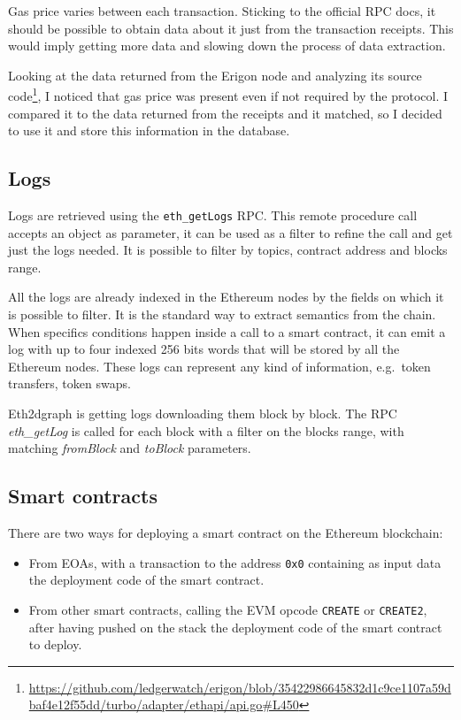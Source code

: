 Gas price varies between each transaction. Sticking to the official RPC docs, it should be possible to obtain data about it just from the transaction receipts. This would imply getting more data and slowing down the process of data extraction.

Looking at the data returned from the Erigon node and analyzing its source code\footnote{\url{https://github.com/ledgerwatch/erigon/blob/35422986645832d1c9ce1107a59dbaf4e12f55dd/turbo/adapter/ethapi/api.go\#L450}}, I noticed that gas price was present even if not required by the protocol. I compared it to the data returned from the receipts and it matched, so I decided to use it and store this information in the database.

\subsection{Logs}

Logs are retrieved using the \texttt{eth\_getLogs} RPC. This remote procedure call accepts an object as parameter, it can be used as a filter to refine the call and get just the logs needed. It is possible to filter by topics, contract address and blocks range. 

All the logs are already indexed in the Ethereum nodes by the fields on which it is possible to filter. It is the standard way to extract semantics from the chain. When specifics conditions happen inside a call to a smart contract, it can emit a log with up to four indexed 256 bits words that will be stored by all the Ethereum nodes. These logs can represent any kind of information, e.g.~token transfers, token swaps.

Eth2dgraph is getting logs downloading them block by block. The RPC \textit{eth\_getLog} is called for each block with a filter on the blocks range, with matching \textit{fromBlock} and \textit{toBlock} parameters.

\subsection{Smart contracts}

There are two ways for deploying a smart contract on the Ethereum blockchain: 

\begin{itemize}
    \item From EOAs, with a transaction to the address \texttt{0x0} containing as input data the deployment code of the smart contract.
    \item From other smart contracts, calling the EVM opcode \texttt{CREATE} or \texttt{CREATE2}, after having pushed on the stack the deployment code of the smart contract to deploy.
\end{itemize}

